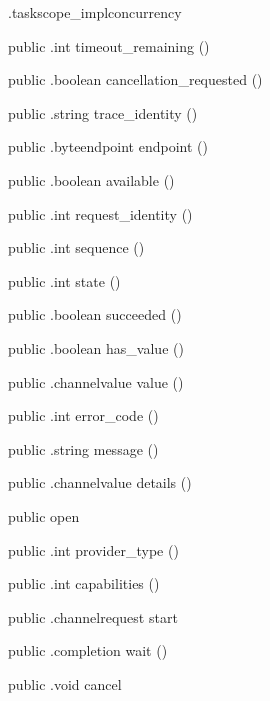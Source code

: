 \begin{CrexxClass}{.taskscope\_impl}{concurrency}
\begin{Members}
    \Method
      {public}
      {.int}
      {timeout\_remaining}
      {()}

    \Method
      {public}
      {.boolean}
      {cancellation\_requested}
      {()}

    \Method
      {public}
      {.string}
      {trace\_identity}
      {()}

    \Method
      {public}
      {.byteendpoint}
      {endpoint}
      {()}

    \Method
      {public}
      {.boolean}
      {available}
      {()}

    \Method
      {public}
      {.int}
      {request\_identity}
      {()}

    \Method
      {public}
      {.int}
      {sequence}
      {()}

    \Method
      {public}
      {.int}
      {state}
      {()}

    \Method
      {public}
      {.boolean}
      {succeeded}
      {()}

    \Method
      {public}
      {.boolean}
      {has\_value}
      {()}

    \Method
      {public}
      {.channelvalue}
      {value}
      {()}

    \Method
      {public}
      {.int}
      {error\_code}
      {()}

    \Method
      {public}
      {.string}
      {message}
      {()}

    \Method
      {public}
      {.channelvalue}
      {details}
      {()}

    \Factory
      {public}
      {open}
      {}

    \Method
      {public}
      {.int}
      {provider\_type}
      {()}

    \Method
      {public}
      {.int}
      {capabilities}
      {()}

    \Method
      {public}
      {.channelrequest}
      {start}
      {}

    \Method
      {public}
      {.completion}
      {wait}
      {()}

    \Method
      {public}
      {.void}
      {cancel}
      {}


\end{Members}
\end{CrexxClass}
